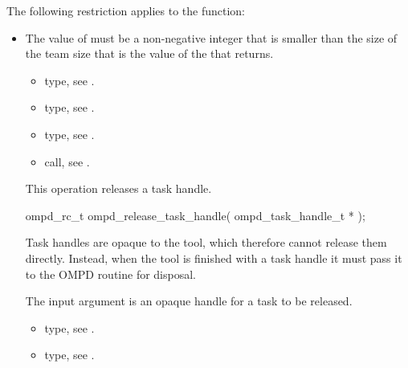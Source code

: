 \restrictions

The following restriction applies to the  function:

\begin{itemize}
\item The value of  must be a non-negative integer that is 
      smaller than the size of the team size that is the value of the 
       that  returns.

\crossreferences
\begin{itemize}
\item {} type, 
see .

\item {} type, see .

\item {} type, see .

\item {} call, 
see .
\end{itemize}



\label{subsubsubsec:ompd_release_task_handle}
\summary
This operation releases a task handle.

\format

\begin{cspecific}
\begin{ompSyntax}
ompd_rc_t ompd_release_task_handle(
  ompd_task_handle_t *
);
\end{ompSyntax}
\end{cspecific}


\descr
Task handles are opaque to the tool, which therefore cannot release
them directly. Instead, when the tool is finished with a task handle it must
pass it to the OMPD  routine
for disposal.

\argdesc
The input argument  is an opaque handle for a task
to be released.

\crossreferences
\begin{itemize}
	\item {} type, see .
	\item {} type, see .
\end{itemize}



\end{itemize}

